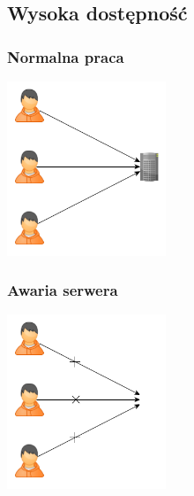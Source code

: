 \documentclass[12pt]{beamer}
\begin{document}
\subsection{Wysoka dostępność}
\begin{frame}
\frametitle{Normalna praca}
\begin{center}
\includegraphics[width=180px]{img/ha1.png}
\end{center}
\end{frame}
\begin{frame}
\frametitle{Awaria serwera}
\begin{center}
\includegraphics[width=180px]{img/ha2.png}
\end{center}
\end{frame}
\end{document}
